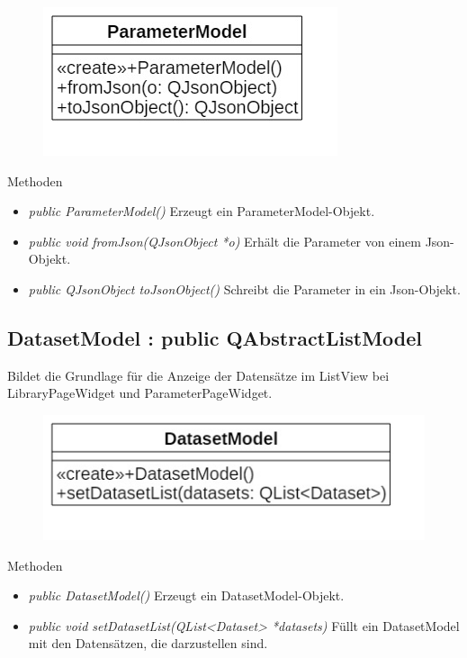 \begin{figure}[H]
	\centering
	\includegraphics[scale=0.5]{img/Klassendiagramm/Klassen/View/ParameterModel}
	\label{fig:parameterModel}
\end{figure}

Methoden
\begin{itemize}
	\item\textit{public ParameterModel()}
	Erzeugt ein ParameterModel-Objekt.
	\item\textit{public void fromJson(QJsonObject *o)}
	Erhält die Parameter von einem Json-Objekt.
	\item\textit{public QJsonObject toJsonObject()}
	Schreibt die Parameter in ein Json-Objekt.
\end{itemize}

\subsection*{DatasetModel : public QAbstractListModel}
Bildet die Grundlage für die Anzeige der Datensätze im ListView bei LibraryPageWidget und ParameterPageWidget.

\begin{figure}[H]
	\centering
	\includegraphics[scale=0.5]{img/Klassendiagramm/Klassen/View/DatasetModel}
	\label{fig:datasetModel}
\end{figure}

Methoden
\begin{itemize}
	\item\textit{public DatasetModel()}
	Erzeugt ein DatasetModel-Objekt.
	\item\textit{public void setDatasetList(QList<Dataset> *datasets)}
	Füllt ein DatasetModel mit den Datensätzen, die darzustellen sind.
\end{itemize}


